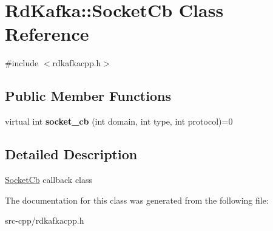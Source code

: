 \hypertarget{classRdKafka_1_1SocketCb}{\section{Rd\-Kafka\-:\-:Socket\-Cb Class Reference}
\label{classRdKafka_1_1SocketCb}
}


{\ttfamily \#include $<$rdkafkacpp.\-h$>$}

\subsection*{Public Member Functions}
\begin{DoxyCompactItemize}
\item 
\hypertarget{classRdKafka_1_1SocketCb_a60b5be4697eb7bd7e9dfae4f5cbc3401}{virtual int {\bfseries socket\-\_\-cb} (int domain, int type, int protocol)=0}\label{classRdKafka_1_1SocketCb_a60b5be4697eb7bd7e9dfae4f5cbc3401}

\end{DoxyCompactItemize}


\subsection{Detailed Description}
\hyperlink{classRdKafka_1_1SocketCb}{Socket\-Cb} callback class 

The documentation for this class was generated from the following file\-:\begin{DoxyCompactItemize}
\item 
src-\/cpp/rdkafkacpp.\-h\end{DoxyCompactItemize}
